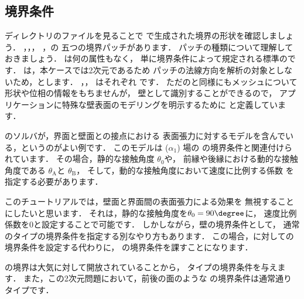 \subsection{境界条件}
\label{ssec:2.3.2}
ディレクトリのファイルを見ることで
で生成された境界の形状を確認しましょう．
，，，
，の
五つの境界パッチがあります．
パッチの種類について理解しておきましょう．
は何の属性もなく，
単に境界条件によって規定される標準のです．
は，本ケースでは2次元であるため
パッチの法線方向を解析の対象としないため，とします．
，，
はそれぞれ
%
%
です．
ただのと同様にもメッシュについて形状や位相の情報をもちませんが，
壁として識別することができるので，
アプリケーションに特殊な壁表面のモデリングを明示するために
と定義しています．

のソルバが，界面と壁面との接点における
表面張力に対するモデルを含んでいる，というのがよい例です．
このモデルは ($\alpha_{1}$) 場の
%
%
の境界条件と関連付けられています．
その場合，静的な接触角度 $\theta_{0}$や，
前縁や後縁における動的な接触角度である
 $\theta_{\mathrm{A}}$と $\theta_{\mathrm{B}}$，
そして，動的な接触角度において速度に比例する係数
を指定する必要があります．

このチュートリアルでは，壁面と界面間の表面張力による効果を
無視することにしたいと思います．
それは，静的な接触角度を$\theta_{0} = 90\degree$に，
速度比例係数を$0$と設定することで可能です．
しかしながら，壁の境界条件として，
通常のタイプの境界条件を指定する別なやり方もあります．
この場合，に対しての境界条件を設定する代わりに，
の境界条件を課すことになります．

の境界は大気に対して開放されていることから，
タイプの境界条件を与えます．
また，この2次元問題において，前後の面のような
の境界条件は通常通りタイプです．

